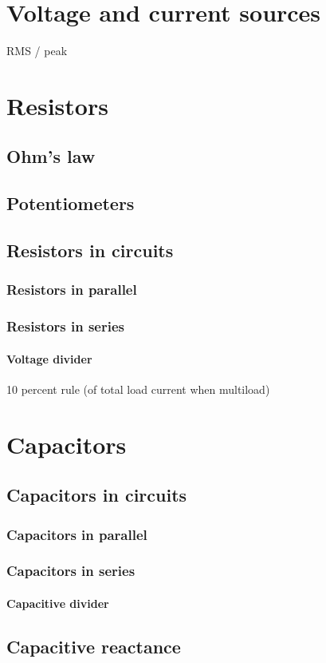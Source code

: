 \documentclass{report}
\begin{document}
\section{Voltage and current sources}
RMS / peak
\section{Resistors}
\subsection{Ohm's law}
\subsection{Potentiometers}
\subsection{Resistors in circuits}
\subsubsection{Resistors in parallel}
\subsubsection{Resistors in series}
\paragraph{Voltage divider}
10 percent rule (of total load current when multiload)
\section{Capacitors}
\subsection{Capacitors in circuits}
\subsubsection{Capacitors in parallel}
\subsubsection{Capacitors in series}
\paragraph{Capacitive divider}
\subsection{Capacitive reactance}
\end{document}
